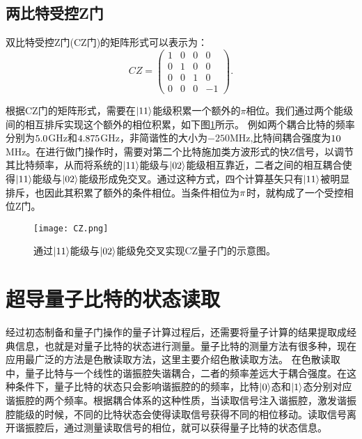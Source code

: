 \subsection{两比特受控Z门}

双比特受控Z门(CZ门)的矩阵形式可以表示为：
\begin{equation}
CZ=\begin{pmatrix}
		1 & 0 & 0 & 0 \\
		0 & 1 & 0 & 0 \\
		0 & 0 & 1 & 0 \\
		0 & 0 & 0 & -1 
	\end{pmatrix}.
\end{equation}

根据CZ门的矩阵形式，需要在$\left|11\right>$能级积累一个额外的$\pi$相位。我们通过两个能级间的相互排斥实现这个额外的相位积累，如下图\ref{fig:CZ}所示。
例如两个耦合比特的频率分别为$\rm 5.0$GHz和$\rm 4.875$GHz，非简谐性的大小为$-250$MHz,比特间耦合强度为$\rm 10$MHz。在进行做门操作时，需要对第二个比特施加类方波形式的快Z信号，以调节其比特频率，从而将系统的$\left|11\right>$能级与$\left|02\right>$能级相互靠近，二者之间的相互耦合使得$\left|11\right>$能级与$\left|02\right>$能级形成免交叉。通过这种方式，四个计算基矢只有$\left|11\right>$被明显排斥，也因此其积累了额外的条件相位。当条件相位为$\rm \pi$时，就构成了一个受控相位Z门。

\begin{figure}[h]
	\centering
	\texttt{[image: CZ.png]}
	\caption{通过$\left|11\right>$能级与$\left|02\right>$能级免交叉实现CZ量子门的示意图。}
	\label{fig:CZ}
\end{figure}




\section{超导量子比特的状态读取}
经过初态制备和量子门操作的量子计算过程后，还需要将量子计算的结果提取成经典信息，也就是对量子比特的状态进行测量。量子比特的测量方法有很多种，现在应用最广泛的方法是色散读取方法，这里主要介绍色散读取方法。
在色散读取中，量子比特与一个线性的谐振腔失谐耦合，二者的频率差远大于耦合强度。在这种条件下，量子比特的状态只会影响谐振腔的的频率，比特$ \left|0\right>$态和$ \left|1\right>$态分别对应谐振腔的两个频率。根据耦合体系的这种性质，当读取信号注入谐振腔，激发谐振腔能级的时候，不同的比特状态会使得读取信号获得不同的相位移动。读取信号离开谐振腔后，通过测量读取信号的相位，就可以获得量子比特的状态信息。
